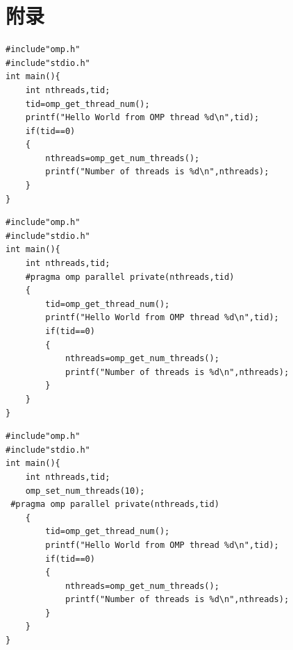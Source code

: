 \documentclass{article}
\begin{document}
\section{附录}
\noindent
\begin{minipage}[t]{0.45\textwidth}
    \begin{lstlisting}[style=cstyle,caption={串行Helloworld}]
#include"omp.h"
#include"stdio.h"
int main(){
    int nthreads,tid;
    tid=omp_get_thread_num();
    printf("Hello World from OMP thread %d\n",tid);
    if(tid==0)
    {
        nthreads=omp_get_num_threads();
        printf("Number of threads is %d\n",nthreads);
    }
}
    \end{lstlisting}
\end{minipage}
\hfill 
\begin{minipage}[t]{0.45\textwidth}
    \begin{lstlisting}[style=cstyle,caption={不设线程并行Helloworld}]
#include"omp.h"
#include"stdio.h"
int main(){
    int nthreads,tid;
    #pragma omp parallel private(nthreads,tid)
    {
        tid=omp_get_thread_num();
        printf("Hello World from OMP thread %d\n",tid);
        if(tid==0)
        {
            nthreads=omp_get_num_threads();
            printf("Number of threads is %d\n",nthreads);
        }
    }
}
    \end{lstlisting}
\end{minipage}
\begin{lstlisting}[style=cstyle,caption={设置10个线程并行Helloworld}]
#include"omp.h"
#include"stdio.h"
int main(){
    int nthreads,tid;
    omp_set_num_threads(10);
 #pragma omp parallel private(nthreads,tid)
    {
        tid=omp_get_thread_num();
        printf("Hello World from OMP thread %d\n",tid);
        if(tid==0)
        {
            nthreads=omp_get_num_threads();
            printf("Number of threads is %d\n",nthreads);
        }
    }
}
\end{lstlisting}
\end{document}
